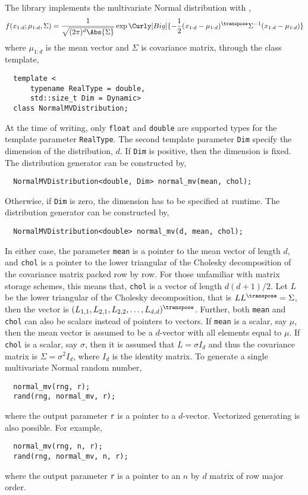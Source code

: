 The library implements the multivariate Normal distribution with \pdf,
\begin{equation*}
  f(x_{1:d};\mu_{1:d},\Sigma) = \frac{1}{\sqrt{(2\pi)^d\Abs{\Sigma}}}
  \exp\Curly[Big]{-\frac{1}{2}
    (x_{1:d} - \mu_{1:d})^{\transpose}\Sigma^{-1}(x_{1:d} - \mu_{1:d})}
\end{equation*}
where $\mu_{1:d}$ is the mean vector and $\Sigma$ is covariance matrix, through
the class template,
\begin{Verbatim}
  template <
      typename RealType = double,
      std::size_t Dim = Dynamic>
  class NormalMVDistribution;
\end{Verbatim}
At the time of writing, only \verb|float| and \verb|double| are supported types
for the template parameter \verb|RealType|. The second template parameter
\verb|Dim| specify the dimension of the distribution, $d$. If \verb|Dim| is
positive, then the dimension is fixed. The distribution generator can be
constructed by,
\begin{Verbatim}
  NormalMVDistribution<double, Dim> normal_mv(mean, chol);
\end{Verbatim}
Otherwise, if \verb|Dim| is zero, the dimension has to be specified at runtime.
The distribution generator can be constructed by,
\begin{Verbatim}
  NormalMVDistribution<double> normal_mv(d, mean, chol);
\end{Verbatim}
In either case, the parameter \verb|mean| is a pointer to the mean vector of
length $d$, and \verb|chol| is a pointer to the lower triangular of the
Cholesky decomposition of the covariance matrix packed row by row. For those
unfamiliar with matrix storage schemes, this means that, \verb|chol| is a
vector of length $d(d+1)/2$. Let $L$ be the lower triangular of the Cholesky
decomposition, that is $LL^{\transpose} = \Sigma$, then the vector is
$(L_{1,1},L_{2,1},L_{2,2},\dots,L_{d,d})^{\transpose}$. Further, both
\verb|mean| and \verb|chol| can also be scalars instead of pointers to vectors.
If \verb|mean| is a scalar, say $\mu$, then the mean vector is assumed to be a
$d$-vector with all elements equal to $\mu$. If \verb|chol| is a scalar, say
$\sigma$, then it is assumed that $L = \sigma I_d$ and thus the covariance
matrix is $\Sigma = \sigma^2 I_d$, where $I_d$ is the identity matrix. To
generate a single multivariate Normal random number,
\begin{Verbatim}
  normal_mv(rng, r);
  rand(rng, normal_mv, r);
\end{Verbatim}
where the output parameter \verb|r| is a pointer to a $d$-vector. Vectorized
generating is also possible. For example,
\begin{Verbatim}
  normal_mv(rng, n, r);
  rand(rng, normal_mv, n, r);
\end{Verbatim}
where the output parameter \verb|r| is a pointer to an $n$ by $d$ matrix of row
major order.
